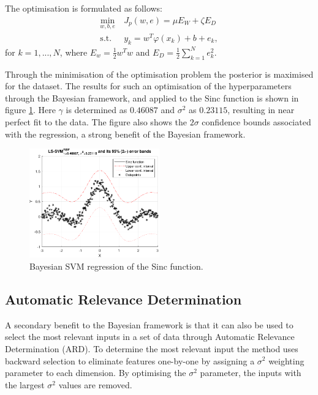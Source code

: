 \documentclass{article}
\begin{document}
        The optimisation is formulated as follows: 
        \begin{equation}\label{eq:bayestuning}
        \begin{split}
            \min_{w,b,e} & \  J_p(w,e) = \mu E_W + \zeta E_D \\
            \text{s.t.} & \   y_k = w^T \varphi(x_k) + b + e_k,
        \end{split}
        \end{equation}
        for $k=1,...,N$, where $E_w = \frac{1}{2} w^Tw$ and $E_D = \frac{1}{2} \sum^N_{k=1} e_k^2$. 
        
        Through the minimisation of the optimisation problem the posterior is maximised for the dataset. The results for such an optimisation of the hyperparameters through the Bayesian framework, and applied to the Sinc function is shown in figure \ref{fig:bayesianregression_sinc}. Here $\gamma$ is determined as $0.46087$ and $\sigma^2$ as $0.23115$, resulting in near perfect fit to the data. The figure also shows the $2\sigma$ confidence bounds associated with the regression, a strong benefit of the Bayesian framework. 
            \begin{figure}[h]
                 \centering
                 \includegraphics[width=0.5\textwidth]{Assignment 2/figures/1_2/bayesian_regression.pdf}
                \caption{Bayesian SVM regression of the Sinc function. }
                \label{fig:bayesianregression_sinc}
            \end{figure}
        
    \subsection{Automatic Relevance Determination}
        A secondary benefit to the Bayesian framework is that it can also be used to select the most relevant inputs in a set of data through Automatic Relevance Determination (ARD). To determine the most relevant input the method uses backward selection to eliminate features one-by-one by assigning a $\sigma^2$ weighting parameter to each dimension. By optimising the $\sigma^2$ parameter, the inputs with the largest $\sigma^2$ values are removed. 
        
\end{document}
